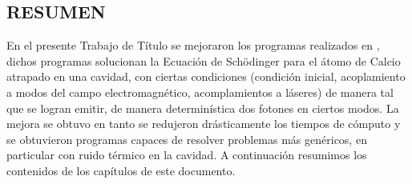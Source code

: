 \begin{center}
\section*{RESUMEN}
\end{center}
\quad En el presente Trabajo de T\'itulo se mejoraron los programas realizados en \cite{gino}, dichos programas solucionan la Ecuaci\'on de Sch\"odinger para el \'atomo de Calcio atrapado en una cavidad, con ciertas condiciones (condici\'on inicial, acoplamiento a modos del campo electromagn\'etico, acomplamientos a l\'aseres) de manera tal que se logran emitir, de manera determin\'istica dos fotones en ciertos modos. La mejora se obtuvo en tanto se redujeron dr\'asticamente los tiempos de c\'omputo y se obtuvieron programas capaces de resolver problemas m\'as gen\'ericos, en particular con ruido t\'ermico en la cavidad. A continuaci\'on resumimos los contenidos de los cap\'itulos de este documento.\\

